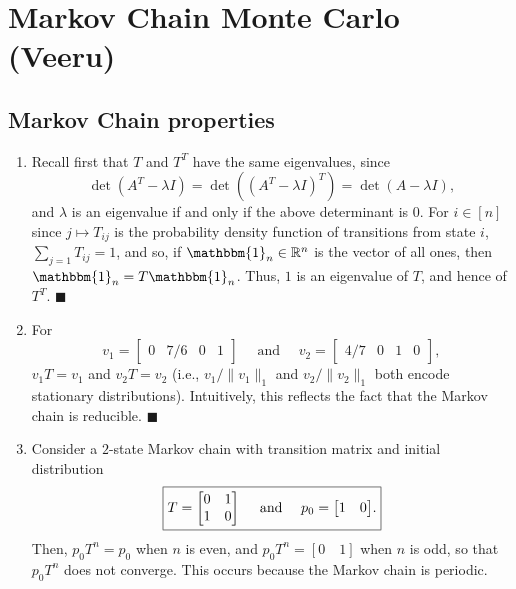\documentclass[11pt]{article}
\renewcommand{\qed}{\quad \ensuremath{\blacksquare}}
\newcommand{\R}{\mathbb{R}} %
\begin{document}
\section{Markov Chain Monte Carlo (Veeru)}
\subsection{Markov Chain properties}
\begin{enumerate}
\item Recall first that $T$ and $T^T$ have the same eigenvalues, since
\[\det(A^T - \lambda I)
    = \det((A^T - \lambda I)^T)
    = \det(A - \lambda I),
\]
and $\lambda$ is an eigenvalue if and only if the above determinant is $0$. For
$i \in [n]$ since $j \mapsto T_{ij}$ is the probability density function of
transitions from state $i$, $\sum_{j = 1} T_{ij} = 1$, and so, if
$\mathbbm{1}_n \in \R^n$ is the vector of all ones, then
$\mathbbm{1}_n = T \mathbbm{1}_n$. Thus, $1$ is an eigenvalue of $T$, and hence
of $T^T$. \qed
\item For
\[v_1 =
    \begin{bmatrix}
        0 & 7/6 & 0 & 1
    \end{bmatrix}
    \quad \mbox{ and } \quad
v_2 =
    \begin{bmatrix}
        4/7 & 0 & 1 & 0
    \end{bmatrix},
\]
$v_1T = v_1$ and $v_2T = v_2$ (i.e., $v_1/\|v_1\|_1$ and $v_2/\|v_2\|_1$ both
encode stationary distributions). Intuitively, this reflects the fact that the
Markov chain is reducible. \qed
\item Consider a $2$-state Markov chain with transition matrix and initial
distribution
\[\mbox{\fbox{$\displaystyle
T =
    \begin{bmatrix}
        0 & 1 \\
        1 & 0
    \end{bmatrix}
    \quad \mbox{ and } \quad
p_0 =
    \begin{bmatrix}
        1 & 0
    \end{bmatrix}$.}}
\]
Then, $p_0T^n = p_0$ when $n$ is even, and $p_0T^n = [0 \quad 1]$ when $n$ is
odd, so that $p_0T^n$ does not converge. This occurs because the Markov chain
is periodic.
\end{enumerate}
\end{document}

